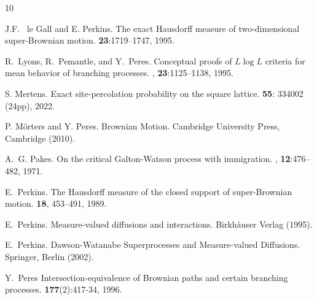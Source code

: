 \documentclass[12pt]{article}
\numberwithin{theorem}{section}
\theoremstyle{def}
\numberwithin{equation}{section}
\begin{document}
\begin{thebibliography}{10}

J.F. ~le Gall and E. Perkins.
\newblock The exact Hausdorff measure of two-dimensional super-Brownian motion.
 {\bf 23}:1719--1747, 1995.

R.~Lyons, R.~Pemantle, and Y.~Peres.
\newblock Conceptual proofs of {{\(L\log L\)}} criteria for mean behavior of
branching processes.
, {\bf 23}:1125--1138, 1995.

S. Mertens.
\newblock Exact site-percolation probability on the square lattice.
 {\bf 55}: 334002 (24pp), 2022.

P. M\"orters and Y. Peres.
\newblock Brownian Motion.
\newblock Cambridge University Press, Cambridge (2010).

A.~G. Pakes.
\newblock On the critical {G}alton-{W}atson process with immigration.
, {\bf 12}:476--482, 1971.

E.~Perkins.
\newblock The Hausdorff measure of the closed support of super-Brownian motion.
 {\bf 18}, 453--491, 1989.

E.~Perkins.
\newblock Measure-valued diffusions and interactions.
\newblock Birkh\"auser Verlag (1995).

E.~Perkins.
\newblock Dawson-Watanabe Superprocesses and Measure-valued Diffusions.
\newblock Springer, Berlin (2002).

Y.~Peres
\newblock Intersection-equivalence of Brownian paths and certain branching processes.  
  {\bf 177}(2):417-34, 1996.




\end{thebibliography}
\end{document}
